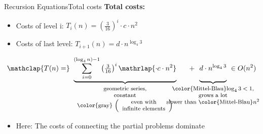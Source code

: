 \begin{frame}{Recursion Equations}{Total costs}
  \textbf{Total costs:}
  \begin{itemize}
    \item<2->
      Costs of {\color{Mittel-Blau}level i}:
      $T_i(n) = \left(\frac{3}{16}\right)^i \cdot c \cdot n^2$
    \item<3->
      Costs of {\color{Mittel-Blau}last level}:
      $T_{i+1}(n) = d \cdot n^{\log_4 3}$
  \end{itemize}
  \vspace{0.5em}
  \begin{displaymath}
    \mathclap{T(n) =}\underbrace{
      \sum\limits_{i = 0}^{(\log_4 n) - 1} \left(\tfrac{3}{16}\right)^i
      \mathrlap{\cdot c \cdot n^2}
    }_{
      \text{
        \footnotesize
        \begin{tabular}{c}
          geometric series,\\
          constant\\
          \color{gray}
          $\left(\begin{array}{c}
            \text{even with}\\
            \text{infinite elements}
          \end{array}\right)$
        \end{tabular}
      }
    } \hspace{1.25em} + \hspace{0.5em} \underbrace{
      d \cdot n^{\log_4 3}
      \vphantom{\sum\limits_{i = 0}^{(\log_4 n) - 1}}
    }_{
      \text{
        \makebox[0pt][c]{
          \footnotesize
          \begin{tabular}{c}
            {\color{Mittel-Blau}$\log_4 3 < 1$},\\
            grows a lot\\
            slower than {\color{Mittel-Blau}$n^2$}
          \end{tabular}
        }
      }
    } ~ \in O(n^2)
  \end{displaymath}
  \begin{itemize}
    \item<5->
      Here: The costs of connecting the partial problems dominate
  \end{itemize}
\end{frame}


